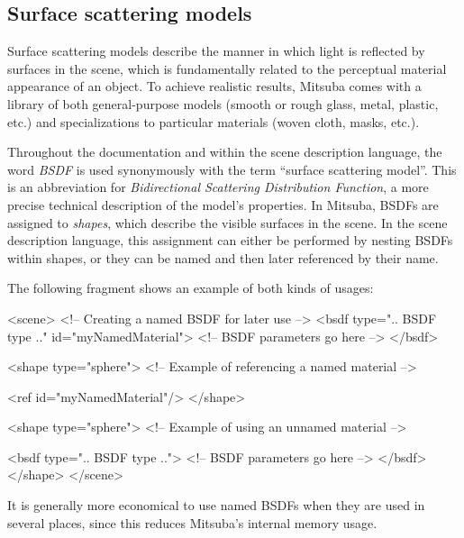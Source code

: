 \subsection{Surface scattering models}
Surface scattering models describe the manner in which light is reflected
by surfaces in the scene, which is fundamentally related to the perceptual
material appearance of an object. To achieve realistic results, Mitsuba 
comes with a library of both general-purpose models (smooth or rough glass, 
metal, plastic, etc.) and specializations to particular materials 
(woven cloth, masks, etc.).

Throughout the documentation and within the scene description language, 
the word \emph{BSDF} is used synonymously with the term ``surface
scattering model''. This is an abbreviation for  \emph{Bidirectional 
Scattering Distribution Function}, a more precise technical 
description of the model's properties. In Mitsuba, BSDFs are 
assigned to \emph{shapes}, which describe the visible surfaces in
the scene. In the scene description language, this assignment can
either be performed by nesting BSDFs within shapes, or they can 
be named and then later referenced by their name.

The following fragment shows an example of both kinds of usages:
\begin{xml}
<scene>
	<!-- Creating a named BSDF for later use -->
	<bsdf type=".. BSDF type .." id="myNamedMaterial">
		<!-- BSDF parameters go here -->
	</bsdf>

	<shape type="sphere">
		<!-- Example of referencing a named material -->

		<ref id="myNamedMaterial"/>
	</shape>

	<shape type="sphere">
		<!-- Example of using an unnamed material -->

		<bsdf type=".. BSDF type ..">
			<!-- BSDF parameters go here -->
		</bsdf>
	</shape>
</scene>
\end{xml}
It is generally more economical to use named BSDFs when they
are used in several places, since this reduces Mitsuba's internal
memory usage.

